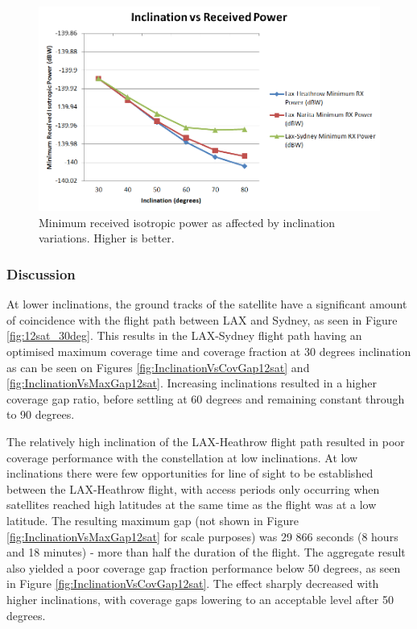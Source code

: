 \begin{figure}[htbp]
	\centering
	\includegraphics[scale = 0.6]{Pictures/InclinationVsRxPower12sat.png}
	
	\caption{Minimum received isotropic power as affected by inclination variations. Higher is better.}
	\label{fig:InclinationVsRxPower12sat}
\end{figure}
\subsubsection{Discussion}
At lower inclinations, the ground tracks of the satellite have a significant amount of coincidence with the flight path between LAX and Sydney, as seen in Figure \ref{fig:12sat_30deg}. This results in the LAX-Sydney flight path having an optimised maximum coverage time and coverage fraction at 30 degrees inclination as can be seen on Figures \ref{fig:InclinationVsCovGap12sat} and \ref{fig:InclinationVsMaxGap12sat}. Increasing inclinations resulted in a higher coverage gap ratio, before settling at 60 degrees and remaining constant through to 90 degrees.

The relatively high inclination of the LAX-Heathrow flight path resulted in poor coverage performance with the constellation at low inclinations. At low inclinations there were few opportunities for line of sight to be established between the LAX-Heathrow flight, with access periods only occurring when satellites reached high latitudes at the same time as the flight was at a low latitude. The resulting maximum gap (not shown in Figure \ref{fig:InclinationVsMaxGap12sat} for scale purposes) was 29 866 seconds (8 hours and 18 minutes) - more than half the duration of the flight. The aggregate result also yielded a poor coverage gap fraction performance below 50 degrees, as seen in Figure \ref{fig:InclinationVsCovGap12sat}. The effect sharply decreased with higher inclinations, with coverage gaps lowering to an acceptable level after 50 degrees.


